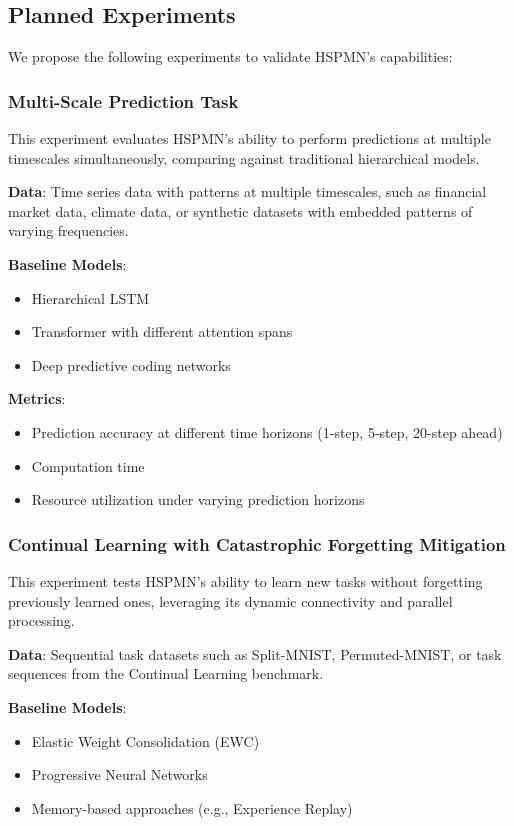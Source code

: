 \documentclass[11pt,a4paper,twocolumn]{article}
\begin{document}
\subsection{Planned Experiments}

We propose the following experiments to validate HSPMN's capabilities:

\subsubsection{Multi-Scale Prediction Task}

This experiment evaluates HSPMN's ability to perform predictions at multiple timescales simultaneously, comparing against traditional hierarchical models.

\textbf{Data}: Time series data with patterns at multiple timescales, such as financial market data, climate data, or synthetic datasets with embedded patterns of varying frequencies.

\textbf{Baseline Models}:
\begin{itemize}
    \item Hierarchical LSTM
    \item Transformer with different attention spans
    \item Deep predictive coding networks
\end{itemize}

\textbf{Metrics}:
\begin{itemize}
    \item Prediction accuracy at different time horizons (1-step, 5-step, 20-step ahead)
    \item Computation time
    \item Resource utilization under varying prediction horizons
\end{itemize}

\subsubsection{Continual Learning with Catastrophic Forgetting Mitigation}

This experiment tests HSPMN's ability to learn new tasks without forgetting previously learned ones, leveraging its dynamic connectivity and parallel processing.

\textbf{Data}: Sequential task datasets such as Split-MNIST, Permuted-MNIST, or task sequences from the Continual Learning benchmark.

\textbf{Baseline Models}:
\begin{itemize}
    \item Elastic Weight Consolidation (EWC)
    \item Progressive Neural Networks
    \item Memory-based approaches (e.g., Experience Replay)
\end{itemize}
\end{document}
